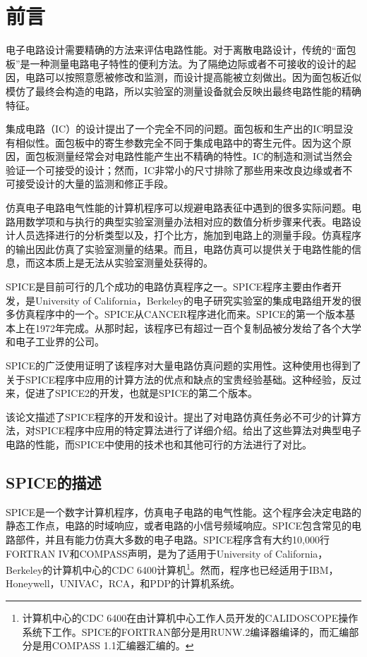 \chapter{前言}
\label{chap:1}
电子电路设计需要精确的方法来评估电路性能。对于离散电路设计，传统的“面包板”是一种测量电路电子特性的便利方法。为了隔绝边际或者不可接收的设计的起因，电路可以按照意愿被修改和监测，而设计提高能被立刻做出。因为面包板近似模仿了最终会构造的电路，所以实验室的测量设备就会反映出最终电路性能的精确特征。

集成电路（IC）的设计提出了一个完全不同的问题。面包板和生产出的IC明显没有相似性。面包板中的寄生参数完全不同于集成电路中的寄生元件。因为这个原因，面包板测量经常会对电路性能产生出不精确的特性。IC的制造和测试当然会验证一个可接受的设计；然而，IC非常小的尺寸排除了那些用来改良边缘或者不可接受设计的大量的监测和修正手段。

仿真电子电路电气性能的计算机程序可以规避电路表征中遇到的很多实际问题。电路用数学项和与执行的典型实验室测量办法相对应的数值分析步骤来代表。电路设计人员选择进行的分析类型以及，打个比方，施加到电路上的测量手段。仿真程序的输出因此仿真了实验室测量的结果。而且，电路仿真可以提供关于电路性能的信息，而这本质上是无法从实验室测量处获得的。

SPICE\cite{ref-1}是目前可行的几个成功的电路仿真程序之一。SPICE程序主要由作者开发，是University of California，Berkeley的电子研究实验室的集成电路组开发的很多仿真程序中的一个。SPICE从CANCER程序进化而来\cite{ref-2,ref-3}。SPICE的第一个版本基本上在1972年完成。从那时起，该程序已有超过一百个复制品被分发给了各个大学和电子工业界的公司。

SPICE的广泛使用证明了该程序对大量电路仿真问题的实用性。这种使用也得到了关于SPICE程序中应用的计算方法的优点和缺点的宝贵经验基础。这种经验，反过来，促进了SPICE2的开发，也就是SPICE的第二个版本。

该论文描述了SPICE程序的开发和设计。提出了对电路仿真任务必不可少的计算方法，对SPICE程序中应用的特定算法进行了详细介绍。给出了这些算法对典型电子电路的性能，而SPICE中使用的技术也和其他可行的方法进行了对比。

\section{SPICE的描述}
SPICE是一个数字计算机程序，仿真电子电路的电气性能。这个程序会决定电路的静态工作点，电路的时域响应，或者电路的小信号频域响应。SPICE包含常见的电路部件，并且有能力仿真大多数的电子电路。SPICE程序含有大约10,000行FORTRAN IV和COMPASS声明，是为了适用于University of California，Berkeley的计算机中心的CDC 6400计算机\footnote{计算机中心的CDC 6400在由计算机中心工作人员开发的CALIDOSCOPE操作系统下工作。SPICE的FORTRAN部分是用RUNW.2编译器编译的，而汇编部分是用COMPASS 1.1汇编器汇编的。}。然而，程序也已经适用于IBM，Honeywell，UNIVAC，RCA，和PDP的计算机系统。

